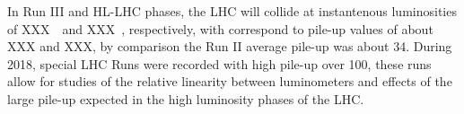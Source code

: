 In Run III and HL-LHC phases, the LHC will collide at instantenous luminosities of XXX\ \instlumiunit\ and XXX\ \instlumiunit, respectively, with correspond to pile-up values of about XXX and XXX, by comparison the Run II average pile-up was about 34. 
During 2018, special LHC Runs were recorded with high pile-up over 100, these runs allow for studies of the relative linearity between luminometers and effects of the large pile-up expected in the high luminosity phases of the LHC.
